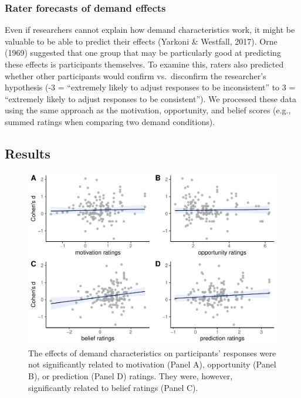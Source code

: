 \documentclass[
  man,floatsintext]{apa6}
\begin{document}
\hypertarget{rater-forecasts-of-demand-effects}{%
\subsubsection{Rater forecasts of demand effects}\label{rater-forecasts-of-demand-effects}}

Even if researchers cannot explain how demand characteristics work, it might be valuable to be able to predict their effects (Yarkoni \& Westfall, 2017). Orne (1969) suggested that one group that may be particularly good at predicting these effects is participants themselves. To examine this, raters also predicted whether other participants would confirm vs.~disconfirm the researcher's hypothesis (-3 = ``extremely likely to adjust responses to be inconsistent'' to 3 = ``extremely likely to adjust responses to be consistent''). We processed these data using the same approach as the motivation, opportunity, and belief scores (e.g., summed ratings when comparing two demand conditions).

\hypertarget{results-1}{%
\subsection{Results}\label{results-1}}

\begin{figure}
\centering
\includegraphics{metaware_manuscript_files/figure-latex/modfig-1.pdf}
\caption{\label{fig:modfig}The effects of demand characteristics on participants' responses were not significantly related to motivation (Panel A), opportunity (Panel B), or prediction (Panel D) ratings. They were, however, significantly related to belief ratings (Panel C).}
\end{figure}
\end{document}
